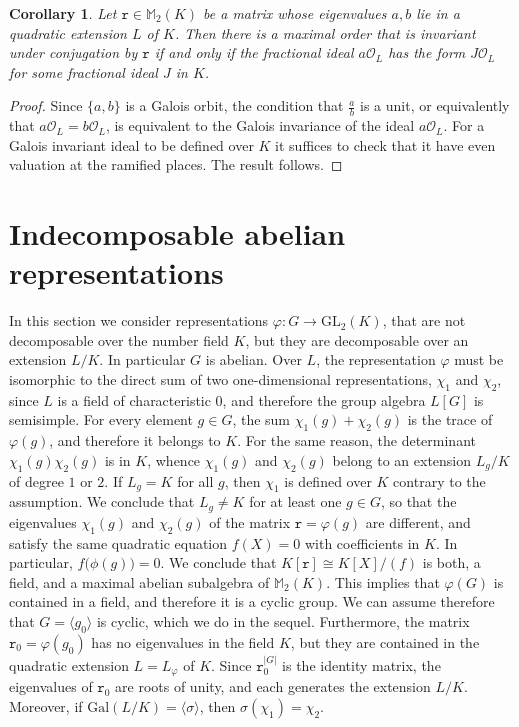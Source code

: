 \documentclass{article}
\newtheorem{Cor}{Corollary}[Prop]
\theoremstyle{definition}
\theoremstyle{remark}
\begin{document}
\begin{Cor}\label{c741}
    Let $\mathtt{r}\in\mathbb{M}_2(K)$ be a matrix whose 
    eigenvalues $a,b$ lie in a quadratic extension $L$ of $K$.
    Then there is a maximal order that is invariant under 
    conjugation by $\mathtt{r}$ if and only 
    if the fractional ideal $a\mathcal{O}_L$ has the form 
    $J\mathcal{O}_L$ for some fractional ideal $J$ in $K$.
\end{Cor}

\begin{proof}
    Since $\{a,b\}$ is a Galois orbit, 
    the condition that $\frac ab$ is a unit,
    or equivalently that $a\mathcal{O}_L=b\mathcal{O}_L$, 
    is equivalent to the
    Galois invariance of the ideal $a\mathcal{O}_L$. 
    For a Galois invariant
    ideal to be defined over $K$ it suffices
    to check that it have even valuation
    at the ramified places. The result follows.  
\end{proof}

\section{Indecomposable abelian representations}\label{S9B}

In this section we consider representations 
$\varphi:G\rightarrow
\mathrm{GL}_2(K)$, that are not decomposable over the 
number field
$K$, but they  are decomposable over an extension $L/K$. 
In particular $G$ is abelian. Over $L$, 
the representation $\varphi$ must be isomorphic 
to the direct sum of 
two one-dimensional representations, 
$\chi_1$ and $\chi_2$, since
$L$ is a field of characteristic $0$, and therefore the group
algebra $L[G]$ is semisimple. For every element $g\in G$, the
sum $\chi_1(g)+\chi_2(g)$ is the trace of 
$\varphi(g)$, and therefore
it belongs to $K$. For the same reason, the determinant
$\chi_1(g)\chi_2(g)$ is in $K$, whence 
$\chi_1(g)$ and $\chi_2(g)$
belong to an extension $L_g/K$ of degree $1$ or $2$. If $L_g=K$
for all $g$, then $\chi_1$ is defined over $K$ contrary to
the assumption. We conclude that $L_g\neq K$ for at 
least one $g\in G$, 
so that the eigenvalues
$\chi_1(g)$ and $\chi_2(g)$ of the 
matrix $\mathtt{r}=\varphi(g)$ 
are different, and satisfy the same 
quadratic equation $f(X)=0$ with 
coefficients in $K$. In particular,
$f\big(\phi(g)\big)=0$.
We conclude that $K[\mathtt{r}]\cong K[X]/(f)$
is both, a field, and a maximal abelian subalgebra of
$\mathbb{M}_2(K)$. This implies that $\varphi(G)$ 
is contained in a field,
and therefore it is a cyclic group. 
We can assume therefore that
$G=\langle g_0\rangle$ is cyclic, which we do in the sequel.
Furthermore, the matrix $\mathtt{r}_0=\varphi(g_0)$ 
has no eigenvalues
in the field $K$, but they are
contained in the quadratic extension $L=L_\varphi$ of $K$.
Since $\mathtt{r}_0^{|G|}$ is the identity matrix,
the eigenvalues 
of $\mathtt{r}_0$ are roots of unity, and each generates
the extension $L/K$. Moreover, if 
$\mathrm{Gal}(L/K)=\langle\sigma\rangle$,
then $\sigma(\chi_1)=\chi_2$. 
\end{document}
